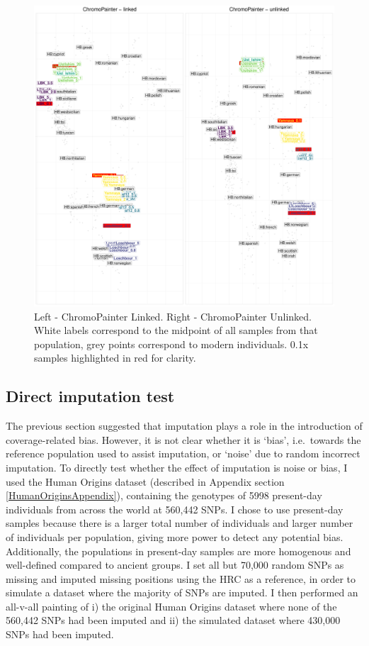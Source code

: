 \begin{figure}[htp]
    \centering
    \includegraphics[width=1.0\textwidth]{../images/chapter1/CP_linked_unlinked.pdf}
    \caption{Left - ChromoPainter Linked. Right - ChromoPainter Unlinked. White labels correspond to the midpoint of all samples from that population, grey points correspond to modern individuals. 0.1x samples highlighted in red for clarity.}
    \label{fig:CP_linked_unlinked}
\end{figure}

\subsection{Direct imputation test} \label{DirectImputationTest}

The previous section suggested that imputation plays a role in the introduction of coverage-related bias. However, it is not clear whether it is `bias', i.e.\ towards the reference population used to assist imputation, or `noise' due to random incorrect imputation. To directly test whether the effect of imputation is noise or bias, I used the Human Origins dataset (described in Appendix section \ref{HumanOriginsAppendix}), containing the genotypes of 5998 present-day individuals from across the world at 560,442 SNPs. I chose to use present-day samples because there is a larger total number of individuals and larger number of individuals per population, giving more power to detect any potential bias. Additionally, the populations in present-day samples are more homogenous and well-defined compared to ancient groups. I set all but 70,000 random SNPs as missing and imputed missing positions using the HRC as a reference, in order to simulate a dataset where the majority of SNPs are imputed. I then performed an all-v-all painting of i) the original Human Origins dataset where none of the 560,442 SNPs had been imputed and ii) the simulated dataset where 430,000 SNPs had been imputed. 

